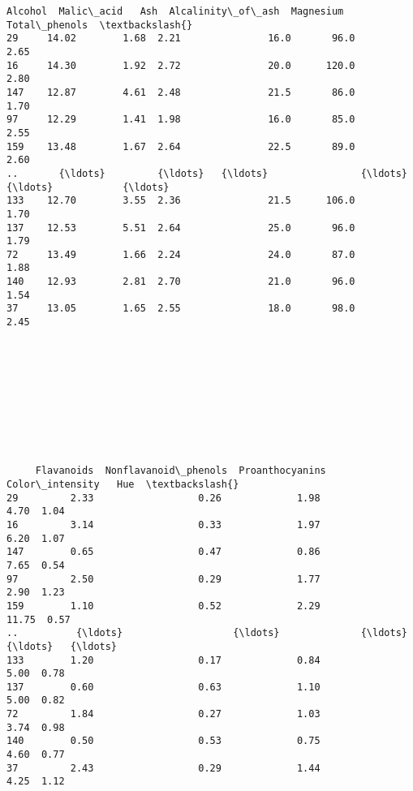 \documentclass[11pt]{article}
\makeatletter
\newcommand{\boxspacing}{\kern\kvtcb@left@rule\kern\kvtcb@boxsep}
\newcommand{\prompt}[4]{
        {\ttfamily\llap{{\color{#2}[#3]:\hspace{3pt}#4}}\vspace{-\baselineskip}}
    }
\makeatother
\begin{document}
            \begin{tcolorbox}[breakable, size=fbox, boxrule=.5pt, pad at break*=1mm, opacityfill=0]
\prompt{Out}{outcolor}{14}{\boxspacing}
\begin{Verbatim}[commandchars=\\\{\}]
     Alcohol  Malic\_acid   Ash  Alcalinity\_of\_ash  Magnesium  Total\_phenols  \textbackslash{}
29     14.02        1.68  2.21               16.0       96.0           2.65
16     14.30        1.92  2.72               20.0      120.0           2.80
147    12.87        4.61  2.48               21.5       86.0           1.70
97     12.29        1.41  1.98               16.0       85.0           2.55
159    13.48        1.67  2.64               22.5       89.0           2.60
..       {\ldots}         {\ldots}   {\ldots}                {\ldots}        {\ldots}            {\ldots}
133    12.70        3.55  2.36               21.5      106.0           1.70
137    12.53        5.51  2.64               25.0       96.0           1.79
72     13.49        1.66  2.24               24.0       87.0           1.88
140    12.93        2.81  2.70               21.0       96.0           1.54
37     13.05        1.65  2.55               18.0       98.0           2.45










     Flavanoids  Nonflavanoid\_phenols  Proanthocyanins  Color\_intensity   Hue  \textbackslash{}
29         2.33                  0.26             1.98             4.70  1.04
16         3.14                  0.33             1.97             6.20  1.07
147        0.65                  0.47             0.86             7.65  0.54
97         2.50                  0.29             1.77             2.90  1.23
159        1.10                  0.52             2.29            11.75  0.57
..          {\ldots}                   {\ldots}              {\ldots}              {\ldots}   {\ldots}
133        1.20                  0.17             0.84             5.00  0.78
137        0.60                  0.63             1.10             5.00  0.82
72         1.84                  0.27             1.03             3.74  0.98
140        0.50                  0.53             0.75             4.60  0.77
37         2.43                  0.29             1.44             4.25  1.12


\end{Verbatim}
\end{tcolorbox}
\end{document}
